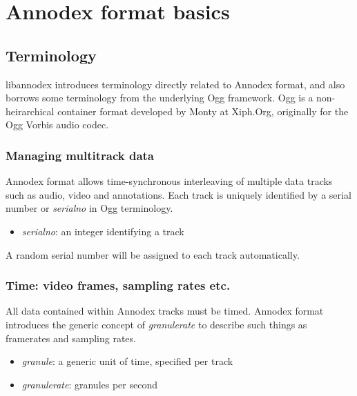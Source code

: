 \section{Annodex format basics}
\label{group__basics}
\subsection{Terminology}\label{Terminology}
libannodex introduces terminology directly related to Annodex format, and also borrows some terminology from the underlying Ogg framework. Ogg is a non-heirarchical container format developed by Monty at Xiph.Org, originally for the Ogg Vorbis audio codec.\subsubsection{Managing multitrack data}\label{multitrack}
Annodex format allows time-synchronous interleaving of multiple data tracks such as audio, video and annotations. Each track is uniquely identified by a serial number or {\em serialno\/} in Ogg terminology.

\begin{itemize}
\item {\em serialno\/}: an integer identifying a track\end{itemize}


A random serial number will be assigned to each track automatically.\subsubsection{Time: video frames, sampling rates etc.}\label{time}
All data contained within Annodex tracks must be timed. Annodex format introduces the generic concept of {\em granulerate\/} to describe such things as framerates and sampling rates.

\begin{itemize}
\item {\em granule\/}: a generic unit of time, specified per track\item {\em granulerate\/}: granules per second \end{itemize}



